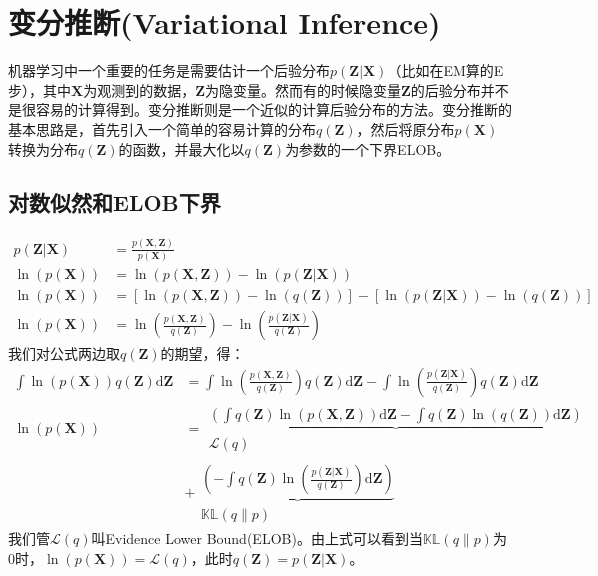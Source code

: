 \chapter{变分推断(Variational Inference)}
机器学习中一个重要的任务是需要估计一个后验分布$p(\mathbf{Z}|\mathbf{X})$（比如在EM算的E步），其中$\mathbf{X}$为观测到的数据，$\mathbf{Z}$为隐变量。然而有的时候隐变量$\mathbf{Z}$的后验分布并不是很容易的计算得到。变分推断则是一个近似的计算后验分布的方法。变分推断的基本思路是，首先引入一个简单的容易计算的分布$q(\mathbf{Z})$，然后将原分布$p(\mathbf{X})$转换为分布$q(\mathbf{Z})$的函数，并最大化以$q(\mathbf{Z})$为参数的一个下界ELOB。

\section{对数似然和ELOB下界}

\begin{displaymath}
\begin{split}
p(\mathbf{Z} | \mathbf{X}) &= \frac{ p(\mathbf{X}, \mathbf{Z})} { p(\mathbf{X}) }\\
\ln (p(\mathbf{X})) &= \ln(p(\mathbf{X}, \mathbf{Z})) - \ln(p(\mathbf{Z}|\mathbf{X}))\\
\ln (p(\mathbf{X})) &= \left [ \ln(p(\mathbf{X}, \mathbf{Z})) -\ln(q(\mathbf{Z})) \right ] - \left [ \ln(p(\mathbf{Z}|\mathbf{X})) - \ln(q(\mathbf{Z})) \right ]\\
\ln (p(\mathbf{X})) &= \ln(\frac{ p(\mathbf{X}, \mathbf{Z})}{q(\mathbf{Z})}) - \ln( \frac{p(\mathbf{Z}|\mathbf{X})}{q(\mathbf{Z})})
\end{split}
\end{displaymath}
我们对公式两边取$q(\mathbf{Z})$的期望，得：
\begin{displaymath}
\begin{split}
\int{\ln (p(\mathbf{X})) q(\mathbf{Z})} \mathrm{d}\mathbf{Z} &= \int{ \ln(\frac{ p(\mathbf{X}, \mathbf{Z})}{q(\mathbf{Z})}) q(\mathbf{Z})} \mathrm{d}\mathbf{Z}- \int {\ln( \frac{p(\mathbf{Z}|\mathbf{X})}{q(\mathbf{Z})}) q(\mathbf{Z})} \mathrm{d}\mathbf{Z}\\
\ln(p(\mathbf{X})) &=
\begin{matrix} 
\underbrace { 
\left ( \int{ q(\mathbf{Z}) \ln( p(\mathbf{X}, \mathbf{Z}))} \mathrm{d}\mathbf{Z} -
 \int{ q(\mathbf{Z}) \ln({q(\mathbf{Z})})} \mathrm{d}\mathbf{Z} \right ) 
} \\
\mathcal{L}(q)
\end{matrix}\\
&+
\begin{matrix}
\underbrace{
 \left ( - \int {q(\mathbf{Z}) \ln( \frac{p(\mathbf{Z}|\mathbf{X})}{q(\mathbf{Z})})} \mathrm{d}\mathbf{Z} \right )
}\\
\mathbb{KL}(q\|p)
\end{matrix}
\end{split}
\end{displaymath}
我们管$\mathcal{L}(q)$叫Evidence Lower Bound(ELOB)。由上式可以看到当$\mathbb{KL}(q\|p)$为0时，$\ln(p(\mathbf{X})) = \mathcal{L}(q) $，此时$q(\mathbf{Z}) = p(\mathbf{Z}|\mathbf{X})$。

